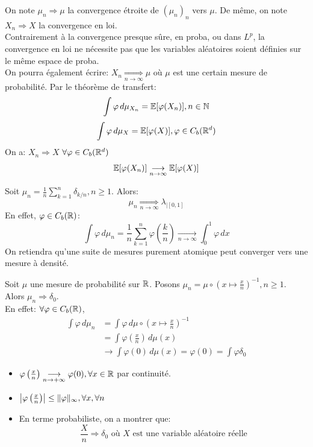 \documentclass[]{report}
\begin{document}
    \begin{re}{}{}
        On note $\mu_n\Longrightarrow \mu$ la convergence étroite de $(\mu_n)_n$ vers $\mu$. De même, on note $X_n\Longrightarrow X$ la convergence en loi.\\
        Contrairement à la convergence presque sûre, en proba, ou dans $L^p$, la convergence en loi ne nécessite pas que les variables aléatoires soient définies sur le même espace de proba.\\
        On pourra également écrire: $X_n \underset{n\to \infty}{\Longrightarrow} \mu$ où $\mu$ est une certain mesure de probabilité. Par le théorème de transfert:
        \[\int \varphi \, d\mu_{X_n}=\mathbb{E}[\varphi(X_n)],n\in \mathbb{N}\]
        \[\int \varphi \, d\mu_X=\mathbb{E}[\varphi(X)],\varphi\in C_b(\mathbb{R}^d)\]
        On a: $X_n\Longrightarrow X$ \ssi $\forall \varphi\in C_b(\mathbb{R}^d)$
        \[\mathbb{E}[\varphi(X_n)]\underset{n\to\infty}{\longrightarrow}\mathbb{E}[\varphi(X)]\]
    \end{re}

    \begin{ex}{}{}
        Soit $\mu_n=\frac{1}{n}\sum_{k=1}^{n}\delta_{k/n},n\ge 1$. Alors:
        \[\mu_n\underset{n\to \infty}{\Longrightarrow} \lambda_{|[0,1]}\]
        En effet, $\varphi\in C_b(\mathbb{R})$:
        \[\int \varphi\, d\mu_n=\frac{1}{n}\sum_{k=1}^{n}\varphi\left(\frac{k}{n}\right)\underset{n\to \infty}{\longrightarrow} \int_{0}^{1}\varphi\, dx\]
        On retiendra qu'une suite de mesures purement atomique peut converger vers une mesure à densité.
    \end{ex}

    \begin{ex}{}{}
        Soit $\mu$ une mesure de probabilité sur $\mathbb{R}$. Posons $\mu_n=\mu\circ(x\mapsto \frac{x}{n})^{-1},n\ge 1$. Alors $\mu_n\Longrightarrow \delta_0$.\\
        En effet: $\forall \varphi\in C_b(\mathbb{R})$,
        \begin{align*}
            \int \varphi\, d\mu_n&=\int \varphi \,d\mu\circ(x\mapsto \frac{x}{n})^{-1}\\
            &= \int \varphi \left(\frac{x}{n}\right)\, d\mu(x)\\
            &\longrightarrow \int \varphi(0)\,d\mu (x)=\varphi(0)=\int \varphi\delta_0
        \end{align*}
        \begin{itemize}
            \item $\varphi\left(\frac{x}{n}\right)\underset{n\to +\infty}{\longrightarrow} \varphi(0),\forall x\in \mathbb{R}$ par continuité.
            \item $\left|\varphi\left(\frac{x}{n}\right)\right|\le \lVert \varphi \rVert_{\infty},\forall x, \forall n$
            \item En terme probabiliste, on a montrer que:
            \[\frac{X}{n}\Longrightarrow \delta_0\text{ où $X$ est une variable aléatoire réelle}\]
        \end{itemize}
    \end{ex}
\end{document}

